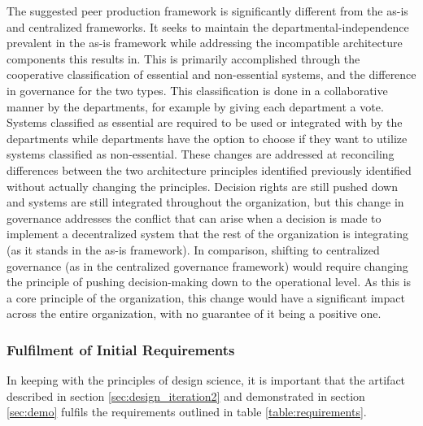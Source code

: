 The suggested peer production framework is significantly different from the as-is and centralized frameworks. It seeks to maintain the departmental-independence prevalent in the as-is framework while addressing the incompatible architecture components this results in. This is primarily accomplished through the cooperative classification of essential and non-essential systems, and the difference in governance for the two types. This classification is done in a collaborative manner by the departments, for example by giving each department a vote. Systems classified as essential are required to be used or integrated with by the departments while departments have the option to choose if they want to utilize systems classified as non-essential. These changes are addressed at reconciling differences between the two architecture principles identified previously identified without actually changing the principles. Decision rights are still pushed down and systems are still integrated throughout the organization, but this change in governance addresses the conflict that can arise when a decision is made to implement a decentralized system that the rest of the organization is integrating (as it stands in the as-is framework). In comparison, shifting to centralized governance (as in the centralized governance framework) would require changing the principle of pushing decision-making down to the operational level. As this is a core principle of the organization, this change would have a significant impact across the entire organization, with no guarantee of it being a positive one. 

%
%
%
%
%
%

\subsubsection*{Fulfilment of Initial Requirements}

In keeping with the principles of design science, it is important that the artifact described in section \ref{sec:design_iteration2} and demonstrated in section \ref{sec:demo} fulfils the requirements outlined in table \ref{table:requirements}. %


